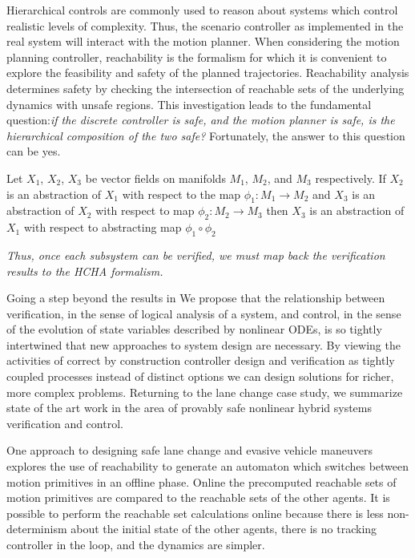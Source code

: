 Hierarchical controls are commonly used to reason about systems which control realistic levels of complexity. Thus, the scenario controller as implemented in the real system will interact with the motion planner. When considering the motion planning controller, reachability is the formalism for which it is convenient to explore the feasibility and safety of the planned trajectories. Reachability analysis determines safety by checking the intersection of reachable sets of the underlying dynamics with unsafe regions. This investigation leads to the fundamental question:{\it if the discrete controller is safe, and the motion planner is safe, is the hierarchical composition of the two safe?} Fortunately, the answer to this question can be yes. 

\begin{prop}
	Let \(X_1\), \(X_2\), \(X_3\) be vector fields on manifolds \(M_1\), \(M_2\), and \(M_3\) respectively. If \(X_2\) is an abstraction of \(X_1\) with respect to the map \(\phi_1 : M_1 \rightarrow M_2\) and \(X_3\) is an abstraction of \(X_2\) with respect to map \(\phi_2 : M_2 \rightarrow M_3\) then \(X_3\) is an abstraction of \(X_1\) with respect to abstracting map \(\phi_1 \circ \phi_2\) \cite{Pappas1998}
\end{prop}

{\it Thus, once each subsystem can be verified, we must map back the verification results to the HCHA formalism.}

Going a step beyond the results in \cite{Pappas1998} We propose that the relationship between verification, in the sense of logical analysis of a system, and control, in the sense of the evolution of state variables described by nonlinear ODEs, is so tightly intertwined that new approaches to system design are necessary. By viewing the activities of correct by construction controller design and verification as tightly coupled processes instead of distinct options we can design solutions for richer, more complex problems. Returning to the lane change case study, we summarize state of the art work in the area of provably safe nonlinear hybrid systems verification and control.

One approach to designing safe lane change and evasive vehicle maneuvers explores the use of reachability to generate an automaton which switches between motion primitives in an offline phase. Online the precomputed reachable sets of motion primitives are compared to the reachable sets of the other agents. It is possible to perform the reachable set calculations online because there is less non-determinism about the initial state of the other agents, there is no tracking controller in the loop, and the dynamics are simpler.\cite{Hess2014}

